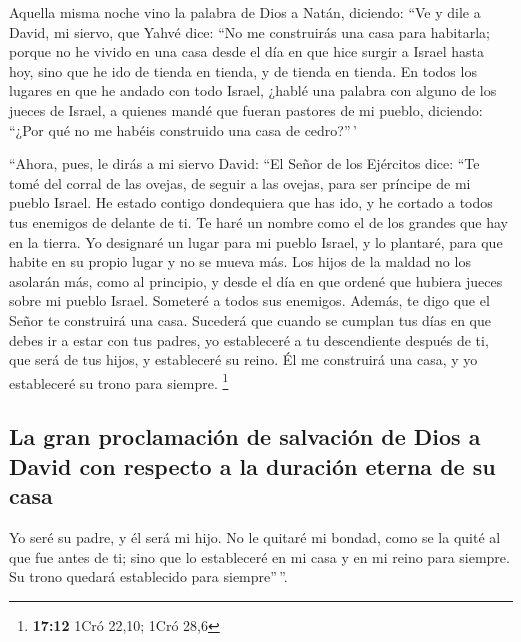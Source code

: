 \begin{paracol}{2}
 Aquella misma noche vino la palabra de Dios a Natán,
diciendo:  ``Ve y dile a David, mi siervo, que Yahvé dice:
``No me construirás una casa para habitarla;  porque no he
vivido en una casa desde el día en que hice surgir a Israel hasta hoy,
sino que he ido de tienda en tienda, y de tienda en tienda.
 En todos los lugares en que he andado con todo Israel,
¿hablé una palabra con alguno de los jueces de Israel, a quienes mandé
que fueran pastores de mi pueblo, diciendo: ``¿Por qué no me habéis
construido una casa de cedro?''\,'

 ``Ahora, pues, le dirás a mi siervo David: ``El Señor de
los Ejércitos dice: ``Te tomé del corral de las ovejas, de seguir a las
ovejas, para ser príncipe de mi pueblo Israel.  He estado
contigo dondequiera que has ido, y he cortado a todos tus enemigos de
delante de ti. Te haré un nombre como el de los grandes que hay en la
tierra.  Yo designaré un lugar para mi pueblo Israel, y lo
plantaré, para que habite en su propio lugar y no se mueva más. Los
hijos de la maldad no los asolarán más, como al principio,
 y desde el día en que ordené que hubiera jueces sobre mi
pueblo Israel. Someteré a todos sus enemigos. Además, te digo que el
Señor te construirá una casa.  Sucederá que cuando se
cumplan tus días en que debes ir a estar con tus padres, yo estableceré
a tu descendiente después de ti, que será de tus hijos, y estableceré su
reino.  Él me construirá una casa, y yo estableceré su
trono para siempre. \footnote{\textbf{17:12} 1Cró 22,10; 1Cró 28,6}

\hypertarget{la-gran-proclamaciuxf3n-de-salvaciuxf3n-de-dios-a-david-con-respecto-a-la-duraciuxf3n-eterna-de-su-casa}{%
\subsection{La gran proclamación de salvación de Dios a David con
respecto a la duración eterna de su
casa}\label{la-gran-proclamaciuxf3n-de-salvaciuxf3n-de-dios-a-david-con-respecto-a-la-duraciuxf3n-eterna-de-su-casa}}

 Yo seré su padre, y él será mi hijo. No le quitaré mi
bondad, como se la quité al que fue antes de ti;  sino
que lo estableceré en mi casa y en mi reino para siempre. Su trono
quedará establecido para siempre''\,''.

\hypertarget{acciuxf3n-de-gracias-y-suxfaplica-de-david}{%
}
\end{paracol}

